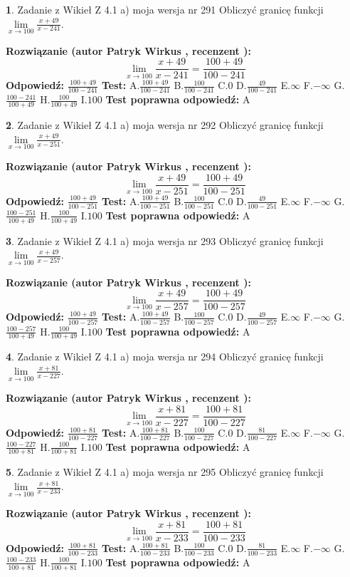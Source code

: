 \documentclass[12pt, a4paper]{article}
\theoremstyle{definition} %
\newtheorem{zad}{}
\newcommand{\zadStart}[1]{\begin{zad}#1\newline}
\newcommand{\zadStop}{\end{zad}}
\newcommand{\rozwStart}[2]{\noindent \textbf{Rozwiązanie (autor #1 , recenzent #2): }\newline}
\newcommand{\rozwStop}{\newline}
\newcommand{\odpStart}{\noindent \textbf{Odpowiedź:}\newline}
\newcommand{\odpStop}{\newline}
\newcommand{\testStart}{\noindent \textbf{Test:}\newline}
\newcommand{\testStop}{\newline}
\newcommand{\kluczStart}{\noindent \textbf{Test poprawna odpowiedź:}\newline}
\newcommand{\kluczStop}{\newline}
\begin{document}
\zadStart{Zadanie z Wikieł Z 4.1 a) moja wersja nr 291}
Obliczyć granicę funkcji $\lim\limits_{x\to100}\frac{x+49}{x-241}$.
\zadStop
\rozwStart{Patryk Wirkus}{}
$$\lim\limits_{x\to100}\frac{x+49}{x-241} = \frac{100+49}{100-241}$$
\rozwStop
\odpStart
$\frac{100+49}{100-241}$
\odpStop
\testStart
A.$\frac{100+49}{100-241}$
B.$\frac{100}{100-241}$
C.$0$
D.$\frac{49}{100-241}$
E.$\infty$
F.$-\infty$
G.$\frac{100-241}{100+49}$
H.$\frac{100}{100+49}$
I.$100$
\testStop
\kluczStart
A
\kluczStop



\zadStart{Zadanie z Wikieł Z 4.1 a) moja wersja nr 292}
Obliczyć granicę funkcji $\lim\limits_{x\to100}\frac{x+49}{x-251}$.
\zadStop
\rozwStart{Patryk Wirkus}{}
$$\lim\limits_{x\to100}\frac{x+49}{x-251} = \frac{100+49}{100-251}$$
\rozwStop
\odpStart
$\frac{100+49}{100-251}$
\odpStop
\testStart
A.$\frac{100+49}{100-251}$
B.$\frac{100}{100-251}$
C.$0$
D.$\frac{49}{100-251}$
E.$\infty$
F.$-\infty$
G.$\frac{100-251}{100+49}$
H.$\frac{100}{100+49}$
I.$100$
\testStop
\kluczStart
A
\kluczStop



\zadStart{Zadanie z Wikieł Z 4.1 a) moja wersja nr 293}
Obliczyć granicę funkcji $\lim\limits_{x\to100}\frac{x+49}{x-257}$.
\zadStop
\rozwStart{Patryk Wirkus}{}
$$\lim\limits_{x\to100}\frac{x+49}{x-257} = \frac{100+49}{100-257}$$
\rozwStop
\odpStart
$\frac{100+49}{100-257}$
\odpStop
\testStart
A.$\frac{100+49}{100-257}$
B.$\frac{100}{100-257}$
C.$0$
D.$\frac{49}{100-257}$
E.$\infty$
F.$-\infty$
G.$\frac{100-257}{100+49}$
H.$\frac{100}{100+49}$
I.$100$
\testStop
\kluczStart
A
\kluczStop



\zadStart{Zadanie z Wikieł Z 4.1 a) moja wersja nr 294}
Obliczyć granicę funkcji $\lim\limits_{x\to100}\frac{x+81}{x-227}$.
\zadStop
\rozwStart{Patryk Wirkus}{}
$$\lim\limits_{x\to100}\frac{x+81}{x-227} = \frac{100+81}{100-227}$$
\rozwStop
\odpStart
$\frac{100+81}{100-227}$
\odpStop
\testStart
A.$\frac{100+81}{100-227}$
B.$\frac{100}{100-227}$
C.$0$
D.$\frac{81}{100-227}$
E.$\infty$
F.$-\infty$
G.$\frac{100-227}{100+81}$
H.$\frac{100}{100+81}$
I.$100$
\testStop
\kluczStart
A
\kluczStop



\zadStart{Zadanie z Wikieł Z 4.1 a) moja wersja nr 295}
Obliczyć granicę funkcji $\lim\limits_{x\to100}\frac{x+81}{x-233}$.
\zadStop
\rozwStart{Patryk Wirkus}{}
$$\lim\limits_{x\to100}\frac{x+81}{x-233} = \frac{100+81}{100-233}$$
\rozwStop
\odpStart
$\frac{100+81}{100-233}$
\odpStop
\testStart
A.$\frac{100+81}{100-233}$
B.$\frac{100}{100-233}$
C.$0$
D.$\frac{81}{100-233}$
E.$\infty$
F.$-\infty$
G.$\frac{100-233}{100+81}$
H.$\frac{100}{100+81}$
I.$100$
\testStop
\kluczStart
A
\kluczStop
\end{document}
